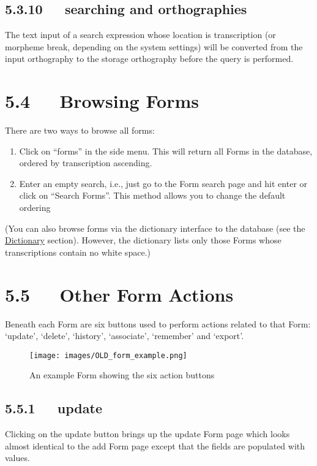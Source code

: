 \documentclass[letterpaper,10pt,english]{sphinxmanual}
\begin{document}
\subsection{5.3.10   searching and orthographies}
\label{user_guide:searching-and-orthographies}
The text input of a search expression whose location is transcription (or
morpheme break, depending on the system settings) will be converted from the
input orthography to the storage orthography before the query is performed.


\section{5.4   Browsing Forms}
\label{user_guide:browsing-forms}
There are two ways to browse all forms:
\begin{enumerate}
\item {} 
Click on ``forms'' in the side menu.  This will return all Forms in the
database, ordered by transcription ascending.

\item {} 
Enter an empty search, i.e., just go to the Form search page and hit enter
or click on ``Search Forms''.  This method allows you to change the default
ordering

\end{enumerate}

(You can also browse forms via the dictionary interface to the database (see the
{\hyperref[user_guide:dictionary]{Dictionary}} section).  However, the dictionary lists only those Forms whose
transcriptions contain no white space.)


\section{5.5   Other Form Actions}
\label{user_guide:other-form-actions}
Beneath each Form are six buttons used to perform actions related to that Form:
`update', `delete', `history', `associate', `remember' and `export'.
\begin{figure}[htbp]
\centering
\capstart

\texttt{[image: images/OLD\_form\_example.png]}
\caption{An example Form showing the six action buttons}\end{figure}


\subsection{5.5.1   update}
\label{user_guide:update}
Clicking on the update button brings up the update Form page which looks almost
identical to the add Form page except that the fields are populated with values.
\end{document}
